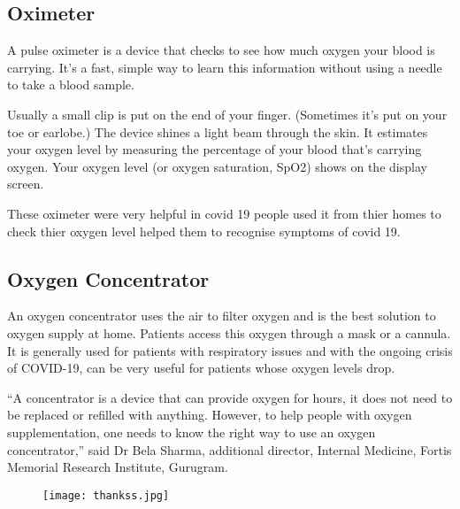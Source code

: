 \documentclass[12pt]{report}
\begin{document}
\subsection{Oximeter}
A pulse oximeter is a device that checks to see how much oxygen your blood is carrying. It's a fast, simple way to learn this information without using a needle to take a blood sample.

Usually a small clip is put on the end of your finger. (Sometimes it's put on your toe or earlobe.) The device shines a light beam through the skin. It estimates your oxygen level by measuring the percentage of your blood that's carrying oxygen. Your oxygen level (or oxygen saturation, SpO2) shows on the display screen.

These oximeter were very helpful in covid 19 people used it from thier homes to check thier oxygen level helped them to recognise symptoms of covid 19.

\subsection{Oxygen Concentrator}
An oxygen concentrator uses the air to filter oxygen and is the best solution to oxygen supply at home. Patients access this oxygen through a mask or a cannula. It is generally used for patients with respiratory issues and with the ongoing crisis of COVID-19, can be very useful for patients whose oxygen levels drop.

“A concentrator is a device that can provide oxygen for hours, it does not need to be replaced or refilled with anything. However, to help people with oxygen supplementation, one needs to know the right way to use an oxygen concentrator,” said Dr Bela Sharma, additional director, Internal Medicine, Fortis Memorial Research Institute, Gurugram.





\clearpage

\begin{figure}
\centering
\texttt{[image: thankss.jpg]}
\end{figure}











\clearpage
\end{document}
